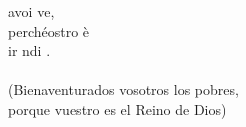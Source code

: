 \begin{cancion}%
	avoi ve,\\
	perchéostro è\\
	ir ndi .\\
	\jump\\
(Bienaventurados vosotros los pobres,\\
porque vuestro es el Reino de Dios)\\
\end{cancion}%
